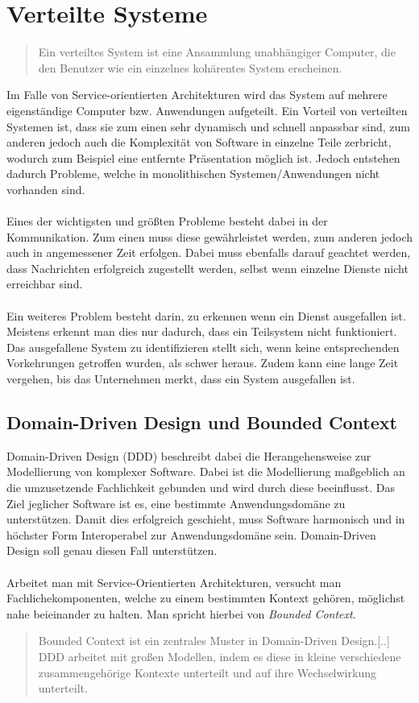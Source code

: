 \section{Verteilte Systeme}
\label{sec:VerteilteAnwendungen}
\begin{quotation}
    \frqq Ein verteiltes System ist eine Ansammlung unabhängiger Computer, die den Benutzer wie ein einzelnes kohärentes System erscheinen.\flqq\cite[S. 19]{tanenbaum:VerteilteSysteme}
\end{quotation}
Im Falle von Service-orientierten Architekturen wird das System auf mehrere eigenständige Computer bzw. Anwendungen aufgeteilt. Ein Vorteil von verteilten Systemen ist, dass sie zum einen sehr dynamisch und schnell anpassbar sind, zum anderen jedoch auch die Komplexität von Software in einzelne Teile zerbricht, wodurch zum Beispiel eine entfernte Präsentation möglich ist.
Jedoch entstehen dadurch Probleme, welche in monolithischen Systemen/Anwendungen nicht vorhanden sind.
\\\\
Eines der wichtigsten und größten Probleme besteht dabei in der Kommunikation. Zum einen muss diese gewährleistet werden, zum anderen jedoch auch in angemessener Zeit erfolgen. Dabei muss ebenfalls darauf geachtet werden, dass Nachrichten erfolgreich zugestellt werden, selbst wenn einzelne Dienste nicht erreichbar sind.
\\\\
Ein weiteres Problem besteht darin, zu erkennen wenn ein Dienst ausgefallen ist. Meistens erkennt man dies nur dadurch, dass ein Teilsystem nicht funktioniert. Das ausgefallene System zu identifizieren stellt sich, wenn keine entsprechenden Vorkehrungen getroffen wurden, als schwer heraus. Zudem kann eine lange Zeit vergehen, bis das Unternehmen merkt, dass ein System ausgefallen ist.

\subsection{Domain-Driven Design und Bounded Context}
\label{sec:boundedContext}
Domain-Driven Design (DDD) beschreibt dabei die Herangehensweise zur Modellierung von komplexer Software. Dabei ist die Modellierung maßgeblich an die umzusetzende Fachlichkeit gebunden und wird durch diese beeinflusst. Das Ziel jeglicher Software ist es, eine bestimmte Anwendungsdomäne zu unterstützen. Damit dies erfolgreich geschieht, muss Software harmonisch und in höchster Form Interoperabel zur Anwendungsdomäne sein. Domain-Driven Design soll genau diesen Fall unterstützen.
\\\\
Arbeitet man mit Service-Orientierten Architekturen, versucht man Fachlichekomponenten, welche zu einem bestimmten Kontext gehören, möglichst nahe beieinander zu halten. Man spricht hierbei von \textit{Bounded Context}. 
\begin{quotation}
    \frqq Bounded Context ist ein zentrales Muster in Domain-Driven Design.[..] DDD arbeitet mit großen Modellen, indem es diese in kleine verschiedene zusammengehörige Kontexte unterteilt und auf ihre Wechselwirkung unterteilt.\flqq \cite{mfowler:BoundedContext}
\end{quotation}

